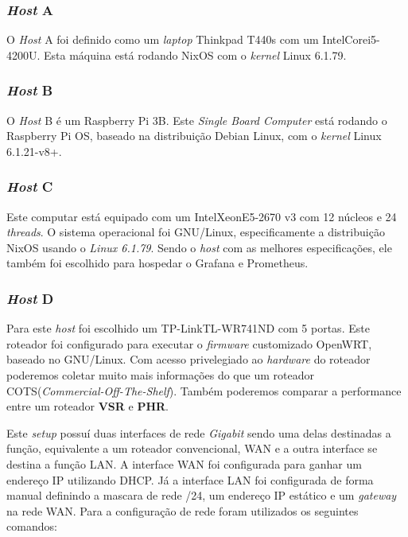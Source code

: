\documentclass[12pt]{article}
\begin{document}
\subsubsection{\textit{Host} A}
O \textit{Host} A foi definido como um \textit{laptop} Thinkpad T440s com um Intel\textregistered\space Core\texttrademark\space i5-4200U. Esta máquina está rodando NixOS com o \textit{kernel} Linux 6.1.79. %

\subsubsection{\textit{Host} B}
O \textit{Host} B é um Raspberry Pi 3B. Este \textit{Single Board Computer} está rodando o Raspberry Pi OS, baseado na distribuição Debian Linux, com o \textit{kernel} Linux 6.1.21-v8+. %

\subsubsection{\textit{Host} C}
Este computar está equipado com um Intel\textregistered\space Xeon\textregistered\space E5-2670 v3 com 12 núcleos e 24 \textit{threads}.
O sistema operacional foi GNU/Linux, especificamente a distribuição NixOS usando o \textit{Linux 6.1.79}. Sendo o \textit{host} com as melhores especificações, ele também foi escolhido para hospedar o Grafana e Prometheus.


\subsubsection{\textit{Host} D}
Para este \textit{host} foi escolhido um TP-Link\textregistered\space TL-WR741ND com 5 portas. Este roteador foi configurado para executar o \textit{firmware} customizado OpenWRT, baseado no GNU/Linux. Com acesso privelegiado ao \textit{hardware} do roteador poderemos coletar muito mais informações do que um roteador COTS(\textit{Commercial-Off-The-Shelf}). Também poderemos comparar a performance entre um roteador \textbf{VSR} e \textbf{PHR}.

Este \textit{setup} possuí duas interfaces de rede \textit{Gigabit} sendo uma delas destinadas a função, equivalente a um roteador convencional, WAN e a outra interface se destina a função LAN. 
A interface WAN foi configurada para ganhar um endereço IP utilizando DHCP.
Já a interface LAN foi configurada de forma manual definindo a mascara de rede /24, um endereço IP estático e um \textit{gateway} na rede WAN.
Para a configuração de rede foram utilizados os seguintes comandos:
\end{document}
